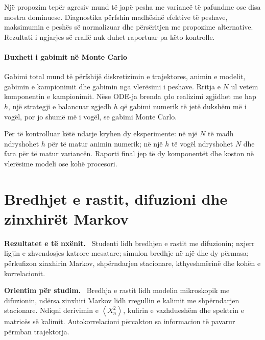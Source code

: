 \documentclass[11pt,oneside,openany]{book}
\newcommand{\avg}[1]{\left\langle #1\right\rangle}
\newenvironment{qellime}{\par\medskip\noindent\textbf{Rezultatet e të nxënit.}\ }{\par\medskip}
\newenvironment{orientim}{\par\medskip\noindent\textbf{Orientim për studim.}\ }{\par\medskip}
\begin{document}
Një propozim tepër agresiv mund të japë pesha me variancë të pafundme ose disa mostra dominuese. Diagnostika përfshin madhësinë efektive të peshave, maksimumin e peshës së normalizuar dhe përsëritjen me propozime alternative. Rezultati i ngjarjes së rrallë nuk duhet raportuar pa këto kontrolle.

\subsubsection{Buxheti i gabimit në Monte Carlo}
Gabimi total mund të përfshijë diskretizimin e trajektores, animin e modelit, gabimin e kampionimit dhe gabimin nga vlerësimi i peshave. Rritja e $N$ ul vetëm komponentin e kampionimit. Nëse ODE-ja brenda çdo realizimi zgjidhet me hap $h$, një strategji e balancuar zgjedh $h$ që gabimi numerik të jetë dukshëm më i vogël, por jo shumë më i vogël, se gabimi Monte Carlo.

Për të kontrolluar këtë ndarje kryhen dy eksperimente: në një $N$ të madh ndryshohet $h$ për të matur animin numerik; në një $h$ të vogël ndryshohet $N$ dhe fara për të matur variancën. Raporti final jep të dy komponentët dhe koston në vlerësime modeli ose kohë procesori.





\chapter{Bredhjet e rastit, difuzioni dhe zinxhirët Markov}
\begin{qellime}
Studenti lidh bredhjen e rastit me difuzionin; nxjerr ligjin e zhvendosjes katrore mesatare; simulon bredhje në një dhe dy përmasa; përkufizon zinxhirin Markov, shpërndarjen stacionare, kthyeshmërinë dhe kohën e korrelacionit.
\end{qellime}

\begin{orientim}
Bredhja e rastit lidh modelin mikroskopik me difuzionin, ndërsa zinxhiri
Markov lidh rregullin e kalimit me shpërndarjen stacionare. Ndiqni derivimin e
$\avg{X_n^2}$, kufirin e vazhdueshëm dhe spektrin e matricës së kalimit.
Autokorrelacioni përcakton sa informacion të pavarur përmban trajektorja.
\end{orientim}
\end{document}
